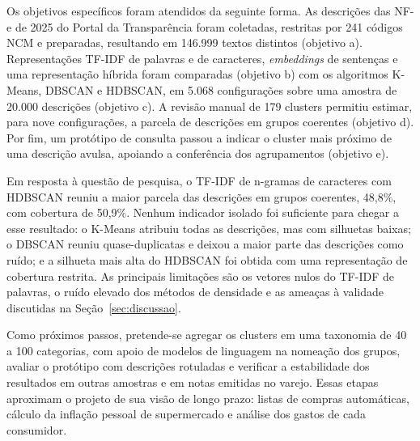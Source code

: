 \documentclass[english,brazilian]{UNISINOSmonografia}
\begin{document}
Os objetivos específicos foram atendidos da seguinte forma. As descrições das NF-e de 2025 do Portal da Transparência foram coletadas, restritas por 241 códigos NCM e preparadas, resultando em 146.999 textos distintos (objetivo a). Representações TF-IDF de palavras e de caracteres, \textit{embeddings} de sentenças e uma representação híbrida foram comparadas (objetivo b) com os algoritmos K-Means, DBSCAN e HDBSCAN, em 5.068 configurações sobre uma amostra de 20.000 descrições (objetivo c). A revisão manual de 179 clusters permitiu estimar, para nove configurações, a parcela de descrições em grupos coerentes (objetivo d). Por fim, um protótipo de consulta passou a indicar o cluster mais próximo de uma descrição avulsa, apoiando a conferência dos agrupamentos (objetivo e).

Em resposta à questão de pesquisa, o TF-IDF de n-gramas de caracteres com HDBSCAN reuniu a maior parcela das descrições em grupos coerentes, 48,8\%, com cobertura de 50,9\%. Nenhum indicador isolado foi suficiente para chegar a esse resultado: o K-Means atribuiu todas as descrições, mas com silhuetas baixas; o DBSCAN reuniu quase-duplicatas e deixou a maior parte das descrições como ruído; e a silhueta mais alta do HDBSCAN foi obtida com uma representação de cobertura restrita. As principais limitações são os vetores nulos do TF-IDF de palavras, o ruído elevado dos métodos de densidade e as ameaças à validade discutidas na Seção~\ref{sec:discussao}.

Como próximos passos, pretende-se agregar os clusters em uma taxonomia de 40 a 100 categorias, com apoio de modelos de linguagem na nomeação dos grupos, avaliar o protótipo com descrições rotuladas e verificar a estabilidade dos resultados em outras amostras e em notas emitidas no varejo. Essas etapas aproximam o projeto de sua visão de longo prazo: listas de compras automáticas, cálculo da inflação pessoal de supermercado e análise dos gastos de cada consumidor.





\end{document}
